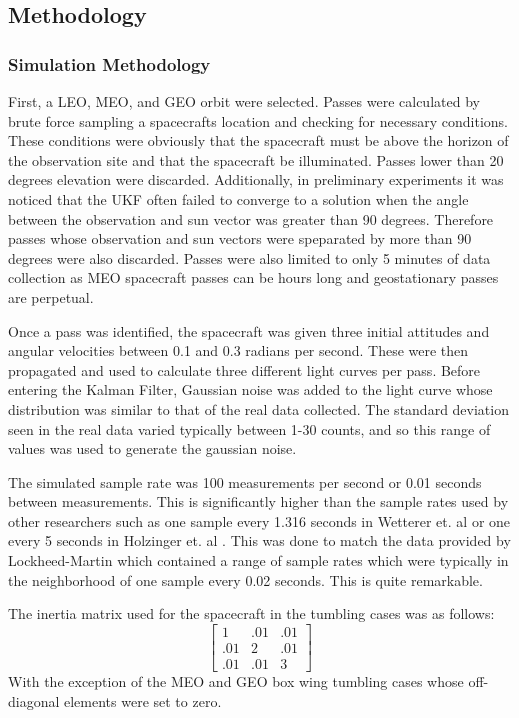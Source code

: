 \subsection{Methodology}

\subsubsection{Simulation Methodology}
First, a LEO, MEO, and GEO orbit were selected. Passes were calculated by brute force sampling a spacecrafts location and checking for necessary conditions. These conditions were obviously that the spacecraft must be above the horizon of the observation site and that the spacecraft be illuminated. Passes lower than 20 degrees elevation were discarded. Additionally, in preliminary experiments it was noticed that the UKF often failed to converge to a solution when the angle between the observation and sun vector was greater than 90 degrees. Therefore passes whose observation and sun vectors were speparated by more than 90 degrees were also discarded. Passes were also limited to only 5 minutes of data collection as MEO spacecraft passes can be hours long and geostationary passes are perpetual.

Once a pass was identified, the spacecraft was given three initial attitudes and angular velocities between 0.1 and 0.3 radians per second. These were then propagated and used to calculate three different light curves per pass. Before entering the Kalman Filter, Gaussian noise was added to the light curve whose distribution was similar to that of the real data collected. The standard deviation seen in the real data varied typically between 1-30 counts, and so this range of values was used to generate the gaussian noise.

The simulated sample rate was 100 measurements per second or 0.01 seconds between measurements. This is significantly higher than the sample rates used by other researchers such as one sample every 1.316 seconds in Wetterer et. al \cite{wetterer_ukf} or one every 5 seconds in Holzinger et. al \cite{Holzinger2012AttitudeEF}. This was done to match the data provided by Lockheed-Martin which contained a range of sample rates which were typically in the neighborhood of one sample every 0.02 seconds. This is quite remarkable.

The inertia matrix used for the spacecraft in the tumbling cases was as follows:
\begin{equation}
\begin{bmatrix}
1 & .01 & .01 \\ .01 & 2 & .01 \\ .01 & .01 &3
\end{bmatrix}
\end{equation}
With the exception of the MEO and GEO box wing tumbling cases whose off-diagonal elements were set to zero.

